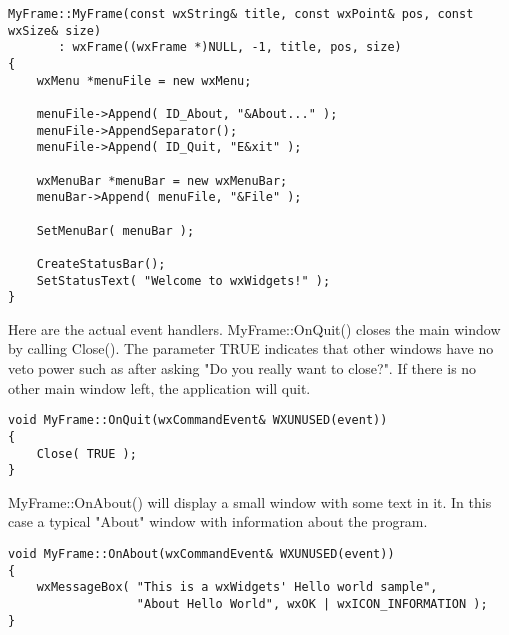 \begin{verbatim}
MyFrame::MyFrame(const wxString& title, const wxPoint& pos, const wxSize& size)
       : wxFrame((wxFrame *)NULL, -1, title, pos, size)
{
    wxMenu *menuFile = new wxMenu;

    menuFile->Append( ID_About, "&About..." );
    menuFile->AppendSeparator();
    menuFile->Append( ID_Quit, "E&xit" );

    wxMenuBar *menuBar = new wxMenuBar;
    menuBar->Append( menuFile, "&File" );

    SetMenuBar( menuBar );

    CreateStatusBar();
    SetStatusText( "Welcome to wxWidgets!" );
}
\end{verbatim}

Here are the actual event handlers. MyFrame::OnQuit() closes the main window
by calling Close(). The parameter TRUE indicates that other windows have no veto
power such as after asking "Do you really want to close?". If there is no other 
main window left, the application will quit.

\begin{verbatim}
void MyFrame::OnQuit(wxCommandEvent& WXUNUSED(event))
{
    Close( TRUE );
}
\end{verbatim}

MyFrame::OnAbout() will display a small window with some text in it. In this
case a typical "About" window with information about the program.

\begin{verbatim}
void MyFrame::OnAbout(wxCommandEvent& WXUNUSED(event))
{
    wxMessageBox( "This is a wxWidgets' Hello world sample",
                  "About Hello World", wxOK | wxICON_INFORMATION );
}
\end{verbatim}

